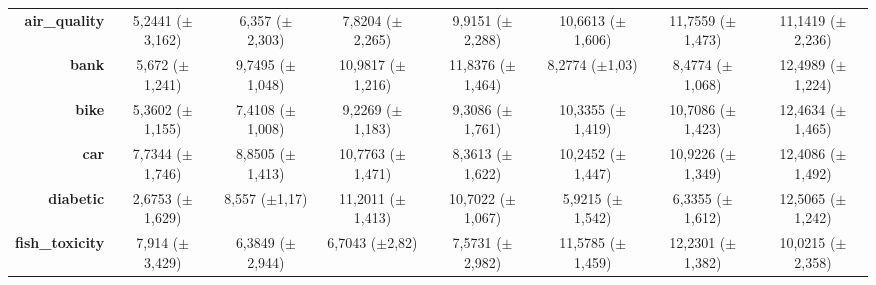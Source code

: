\documentclass[preprint,review,12pt]{elsarticle}
\begin{document}
\begin{table}[!tb]
{\begin{tabular}{r|c|c|ccccc|}
			\textbf{air\_quality}         & \cellcolor[rgb]{ .765,  .851,  .502}5,2441 ($\pm$3,162)                           & \cellcolor[rgb]{ 1,  .922,  .518}6,357 ($\pm$2,303)     & \cellcolor[rgb]{ .996,  .784,  .494}7,8204 ($\pm$2,265)  & \cellcolor[rgb]{ .984,  .588,  .455}9,9151 ($\pm$2,288)  & \cellcolor[rgb]{ .98,  .518,  .443}10,6613 ($\pm$1,606)  & \cellcolor[rgb]{ .973,  .412,  .42}11,7559 ($\pm$1,473)  & \cellcolor[rgb]{ .976,  .471,  .431}11,1419 ($\pm$2,236) \\
			\textbf{bank}                 & \cellcolor[rgb]{ .914,  .894,  .51}5,672 ($\pm$1,241)                             & \cellcolor[rgb]{ .988,  .639,  .463}9,7495 ($\pm$1,048) & \cellcolor[rgb]{ .98,  .537,  .447}10,9817 ($\pm$1,216)  & \cellcolor[rgb]{ .976,  .467,  .431}11,8376 ($\pm$1,464) & \cellcolor[rgb]{ .992,  .757,  .486}8,2774 ($\pm$1,03)   & \cellcolor[rgb]{ .992,  .741,  .486}8,4774 ($\pm$1,068)  & \cellcolor[rgb]{ .973,  .412,  .42}12,4989 ($\pm$1,224)  \\
			\textbf{bike}                 & \cellcolor[rgb]{ .859,  .878,  .506}5,3602 ($\pm$1,155)                           & \cellcolor[rgb]{ .996,  .843,  .506}7,4108 ($\pm$1,008) & \cellcolor[rgb]{ .988,  .686,  .475}9,2269 ($\pm$1,183)  & \cellcolor[rgb]{ .988,  .682,  .475}9,3086 ($\pm$1,761)  & \cellcolor[rgb]{ .984,  .596,  .455}10,3355 ($\pm$1,419) & \cellcolor[rgb]{ .984,  .561,  .451}10,7086 ($\pm$1,423) & \cellcolor[rgb]{ .973,  .412,  .42}12,4634 ($\pm$1,465)  \\
			\textbf{car}                  & \cellcolor[rgb]{ 1,  .922,  .518}7,7344 ($\pm$1,746)                              & \cellcolor[rgb]{ .996,  .8,  .498}8,8505 ($\pm$1,413)   & \cellcolor[rgb]{ .984,  .592,  .455}10,7763 ($\pm$1,471) & \cellcolor[rgb]{ 1,  .855,  .506}8,3613 ($\pm$1,622)     & \cellcolor[rgb]{ .988,  .651,  .467}10,2452 ($\pm$1,447) & \cellcolor[rgb]{ .984,  .576,  .451}10,9226 ($\pm$1,349) & \cellcolor[rgb]{ .973,  .412,  .42}12,4086 ($\pm$1,492)  \\
			\textbf{diabetic}             & \cellcolor[rgb]{ .494,  .773,  .486}2,6753 ($\pm$1,629)                           & \cellcolor[rgb]{ .992,  .765,  .49}8,557 ($\pm$1,17)    & \cellcolor[rgb]{ .98,  .529,  .443}11,2011 ($\pm$1,413)  & \cellcolor[rgb]{ .984,  .573,  .451}10,7022 ($\pm$1,067) & \cellcolor[rgb]{ .898,  .89,  .51}5,9215 ($\pm$1,542)    & \cellcolor[rgb]{ .949,  .906,  .514}6,3355 ($\pm$1,612)  & \cellcolor[rgb]{ .973,  .412,  .42}12,5065 ($\pm$1,242)  \\
			\textbf{fish\_toxicity}       & \cellcolor[rgb]{ .996,  .788,  .494}7,914 ($\pm$3,429)                            & \cellcolor[rgb]{ 1,  .922,  .518}6,3849 ($\pm$2,944)    & \cellcolor[rgb]{ 1,  .894,  .514}6,7043 ($\pm$2,82)      & \cellcolor[rgb]{ .996,  .82,  .498}7,5731 ($\pm$2,982)   & \cellcolor[rgb]{ .976,  .471,  .431}11,5785 ($\pm$1,459) & \cellcolor[rgb]{ .973,  .412,  .42}12,2301 ($\pm$1,382)  & \cellcolor[rgb]{ .984,  .608,  .459}10,0215 ($\pm$2,358) \\

\end{tabular}}
\end{table}
\end{document}
